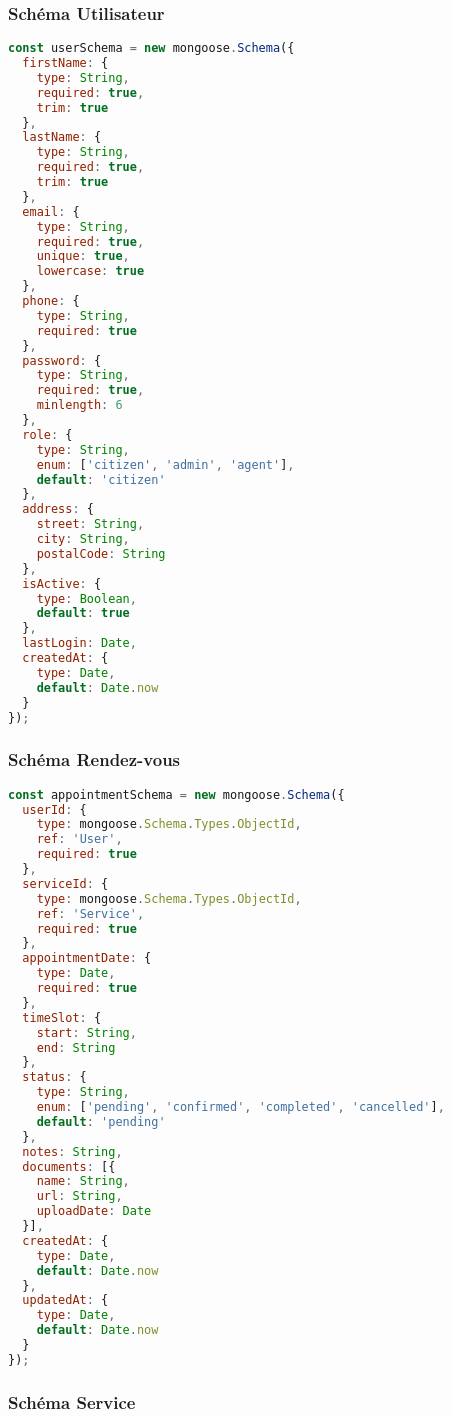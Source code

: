 \subsubsection{Schéma Utilisateur}

\begin{lstlisting}[language=JavaScript, caption=Schéma MongoDB pour les utilisateurs]
const userSchema = new mongoose.Schema({
  firstName: {
    type: String,
    required: true,
    trim: true
  },
  lastName: {
    type: String,
    required: true,
    trim: true
  },
  email: {
    type: String,
    required: true,
    unique: true,
    lowercase: true
  },
  phone: {
    type: String,
    required: true
  },
  password: {
    type: String,
    required: true,
    minlength: 6
  },
  role: {
    type: String,
    enum: ['citizen', 'admin', 'agent'],
    default: 'citizen'
  },
  address: {
    street: String,
    city: String,
    postalCode: String
  },
  isActive: {
    type: Boolean,
    default: true
  },
  lastLogin: Date,
  createdAt: {
    type: Date,
    default: Date.now
  }
});
\end{lstlisting}

\subsubsection{Schéma Rendez-vous}

\begin{lstlisting}[language=JavaScript, caption=Schéma MongoDB pour les rendez-vous]
const appointmentSchema = new mongoose.Schema({
  userId: {
    type: mongoose.Schema.Types.ObjectId,
    ref: 'User',
    required: true
  },
  serviceId: {
    type: mongoose.Schema.Types.ObjectId,
    ref: 'Service',
    required: true
  },
  appointmentDate: {
    type: Date,
    required: true
  },
  timeSlot: {
    start: String,
    end: String
  },
  status: {
    type: String,
    enum: ['pending', 'confirmed', 'completed', 'cancelled'],
    default: 'pending'
  },
  notes: String,
  documents: [{
    name: String,
    url: String,
    uploadDate: Date
  }],
  createdAt: {
    type: Date,
    default: Date.now
  },
  updatedAt: {
    type: Date,
    default: Date.now
  }
});
\end{lstlisting}

\subsubsection{Schéma Service}


